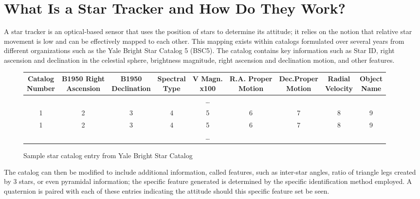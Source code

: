 \section{What Is a Star Tracker and How Do They Work?}
\par \qquad A star tracker is an optical-based sensor that uses the position of stars to determine its attitude; it relies on the notion that relative star movement is low and can be effectively mapped to each other.
This mapping exists within catalogs formulated over several years from different organizations such as the Yale Bright Star Catalog 5 (BSC5). 
The catalog contains key information such as Star ID, right ascension and declination in the celestial sphere, brightness magnitude, right ascension and declination motion, and other features.

\begin{figure}
    \begin{adjustbox}{center}
\begin{tabular}{|| c c c c c c c c c ||}
    \hline
    \thead{Catalog\\Number} & \thead{B1950 Right\\Ascension} & \thead{B1950\\Declination} & \thead{Spectral\\Type} & \thead{V Magn.\\ x100} & \thead{R.A. Proper\\Motion} & \thead{Dec.Proper\\Motion} & \thead{Radial\\Velocity} & \thead{Object\\Name} \\ [0.5ex] 
    \hline\hline

    & & & & \dots & & & & \\ 
    \hline
    1 & 2 & 3 & 4 & 5 & 6 & 7 & 8 & 9 \\
    \hline
    1 & 2 & 3 & 4 & 5 & 6 & 7 & 8 & 9 \\
    \hline
    & & & & \dots & & & & \\ 
    \hline


\end{tabular}
\end{adjustbox}
\caption{Sample star catalog entry from Yale Bright Star Catalog}
\end{figure}

\par \qquad The catalog can then be modified to include additional information, called features, such as inter-star angles, ratio of triangle legs created by 3 stars, or even pyramidal information; the specific feature generated is determined by the specific identification method employed.
A quaternion is paired with each of these entries indicating the attitude should this specific feature set be seen.

